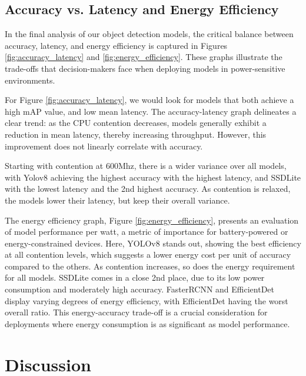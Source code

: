 \documentclass[10pt,twocolumn,letterpaper]{article}
\begin{document}
\subsection{Accuracy vs. Latency and Energy Efficiency}
\label{subsec:accuracy_latency}

In the final analysis of our object detection models, the critical balance between accuracy, latency, and energy efficiency is captured in Figures \ref{fig:accuracy_latency} and \ref{fig:energy_efficiency}. These graphs illustrate the trade-offs that decision-makers face when deploying models in power-sensitive environments.

For Figure \ref{fig:accuracy_latency},  we would look for models that both achieve a high mAP value, and low mean latency. The accuracy-latency graph delineates a clear trend: as the CPU contention decreases, models generally exhibit a reduction in mean latency, thereby increasing throughput. However, this improvement does not linearly correlate with accuracy. 

Starting with contention at 600Mhz, there is a wider variance over all models, with Yolov8 achieving the highest accuracy with the highest latency, and SSDLite with the lowest latency and the 2nd highest accuracy. As contention is relaxed, the models lower their latency, but keep their overall variance.

The energy efficiency graph, Figure \ref{fig:energy_efficiency}, presents an evaluation of model performance per watt, a metric of importance for battery-powered or energy-constrained devices. Here, YOLOv8 stands out, showing the best efficiency at all contention levels, which suggests a lower energy cost per unit of accuracy compared to the others. As contention increases, so does the energy requirement for all models. SSDLite comes in a close 2nd place, due to its low power consumption and moderately high accuracy. FasterRCNN and EfficientDet display varying degrees of energy efficiency, with EfficientDet having the worst overall ratio. This energy-accuracy trade-off is a crucial consideration for deployments where energy consumption is as significant as model performance.


\section{Discussion}
\label{sec:discussion}
\end{document}
